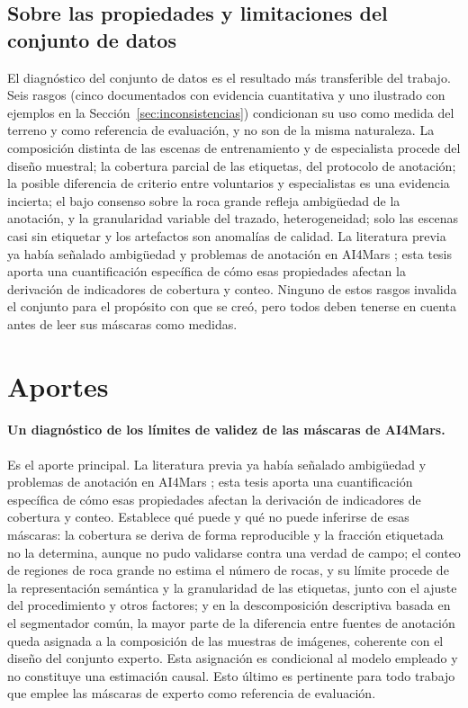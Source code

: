 \subsection{Sobre las propiedades y limitaciones del conjunto de datos}

El diagnóstico del conjunto de datos es el resultado más transferible del trabajo. Seis rasgos
(cinco documentados con evidencia cuantitativa y uno ilustrado con ejemplos en la
Sección~\ref{sec:inconsistencias}) condicionan su uso como medida del terreno y como referencia
de evaluación, y no son de la misma naturaleza. La composición distinta de las escenas de
entrenamiento y de especialista procede del diseño muestral; la cobertura parcial de las
etiquetas, del protocolo de anotación; la posible diferencia de criterio entre voluntarios y
especialistas es una evidencia incierta; el bajo consenso sobre la roca grande refleja
ambigüedad de la anotación, y la granularidad variable del trazado, heterogeneidad; solo las
escenas casi sin etiquetar y los artefactos son anomalías de calidad. La literatura previa ya
había señalado ambigüedad y problemas de anotación en AI4Mars
\citep{swan2021ai4mars, purohit2025marsbench}; esta tesis aporta una cuantificación específica
de cómo esas propiedades afectan la derivación de indicadores de cobertura y conteo. Ninguno de
estos rasgos invalida el conjunto para el propósito con que se creó, pero todos deben tenerse en
cuenta antes de leer sus máscaras como medidas.

\section{Aportes}

\paragraph{Un diagnóstico de los límites de validez de las máscaras de AI4Mars.} Es el aporte
principal. La literatura previa ya había señalado ambigüedad y problemas de anotación en AI4Mars
\citep{swan2021ai4mars, purohit2025marsbench}; esta tesis aporta una cuantificación específica
de cómo esas propiedades afectan la derivación de indicadores de cobertura y conteo. Establece
qué puede y qué no puede inferirse de esas máscaras: la cobertura se deriva de forma
reproducible y la fracción etiquetada no la determina, aunque no pudo validarse contra una verdad
de campo; el conteo de regiones de roca grande no estima el número de rocas, y su límite procede
de la representación semántica y la granularidad de las etiquetas, junto con el ajuste del
procedimiento y otros factores; y en la descomposición descriptiva basada en el
segmentador común, la mayor parte de la diferencia entre fuentes de anotación queda asignada a la
composición de las muestras de imágenes, coherente con el diseño del conjunto experto. Esta
asignación es condicional al modelo empleado y no constituye una estimación causal. Esto
último es pertinente para todo trabajo que emplee las máscaras de experto como referencia de
evaluación.

